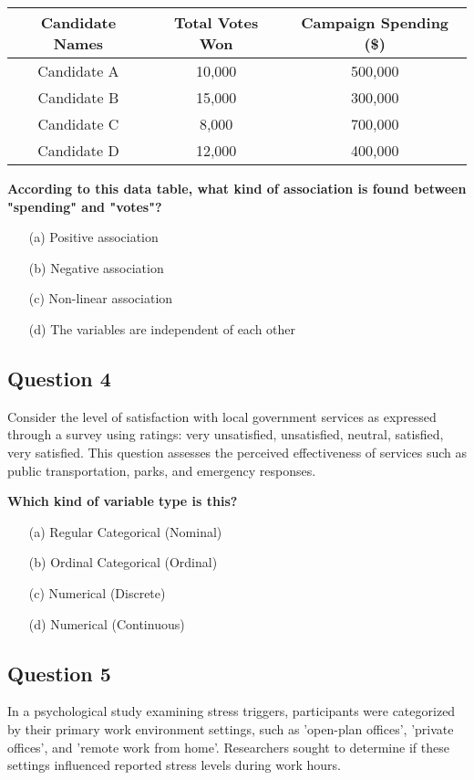 \documentclass{article}
\begin{document}
\begin{table}[h!]
\centering
\begin{tabular}{|c|c|c|}
    \hline
    \textbf{Candidate Names} & \textbf{Total Votes Won} & \textbf{Campaign Spending (\$)} \\
    \hline
    Candidate A & 10,000 & 500,000 \\
    Candidate B & 15,000 & 300,000 \\
    Candidate C & 8,000 & 700,000 \\
    Candidate D & 12,000 & 400,000 \\
    \hline
\end{tabular}
\end{table}

\textbf{According to this data table, what kind of association is found between "spending" and "votes"?}
\begin{enumerate}
    \item[(a)] Positive association
    \item[(b)] Negative association
    \item[(c)] Non-linear association
    \item[(d)] The variables are independent of each other
\end{enumerate}

\subsection*{Question 4}
Consider the level of satisfaction with local government services as expressed through a survey using ratings: very unsatisfied, unsatisfied, neutral, satisfied, very satisfied. This question assesses the perceived effectiveness of services such as public transportation, parks, and emergency responses.

\textbf{Which kind of variable type is this?}
\begin{enumerate}
    \item[(a)] Regular Categorical (Nominal)
    \item[(b)] Ordinal Categorical (Ordinal)
    \item[(c)] Numerical (Discrete)
    \item[(d)] Numerical (Continuous)
\end{enumerate}

\subsection*{Question 5}
In a psychological study examining stress triggers, participants were categorized by their primary work environment settings, such as 'open-plan offices', 'private offices', and 'remote work from home'. Researchers sought to determine if these settings influenced reported stress levels during work hours.
\end{document}
